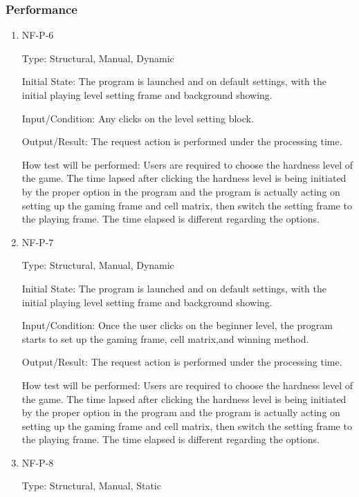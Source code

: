 \documentclass[12pt, titlepage]{article}
\begin{document}
\subsubsection{Performance}

\begin{enumerate}

\item{NF-P-6\\}

Type: Structural, Manual, Dynamic

Initial State:  The program is launched and on default settings, with the initial playing level setting frame and background showing.

Input/Condition: Any clicks on the level setting block.

Output/Result: The request action is performed under the processing time.

How test will be performed: Users are required to choose the hardness level of the game. The time lapsed after clicking the hardness level is being initiated by the proper option in the program and the program is actually acting on setting up the gaming frame and cell matrix, then switch the setting frame to the playing frame. The time elapsed is different regarding the options.

\item{NF-P-7\\}

Type: Structural, Manual, Dynamic

Initial State: The program is launched and on default settings, with the initial playing level setting frame and background showing.

Input/Condition: Once the user clicks on the beginner level, the program starts to set up the gaming frame, cell matrix,and winning method.

Output/Result: The request action is performed under the processing time.

How test will be performed: Users are required to choose the hardness level of the game. The time lapsed after clicking the hardness level is being initiated by the proper option in the program and the program is actually acting on setting up the gaming frame and cell matrix, then switch the setting frame to the playing frame. The time elapsed is different regarding the options.

\item{NF-P-8\\}

Type: Structural, Manual, Static


\end{enumerate}
\end{document}
